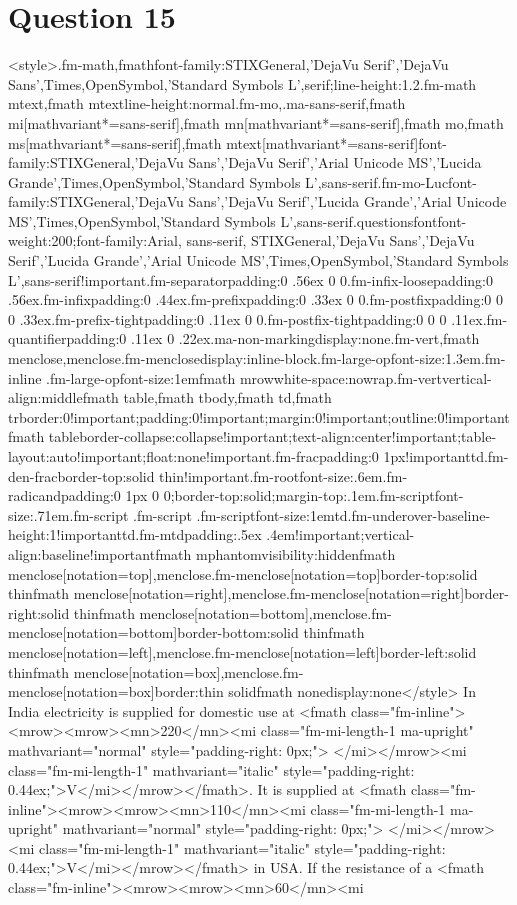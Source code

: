 \documentclass{article}
\begin{document}
\section*{Question 15}
<style>.fm-math,fmath{font-family:STIXGeneral,'DejaVu Serif','DejaVu Sans',Times,OpenSymbol,'Standard Symbols L',serif;line-height:1.2}.fm-math mtext,fmath mtext{line-height:normal}.fm-mo,.ma-sans-serif,fmath mi[mathvariant*=sans-serif],fmath mn[mathvariant*=sans-serif],fmath mo,fmath ms[mathvariant*=sans-serif],fmath mtext[mathvariant*=sans-serif]{font-family:STIXGeneral,'DejaVu Sans','DejaVu Serif','Arial Unicode MS','Lucida Grande',Times,OpenSymbol,'Standard Symbols L',sans-serif}.fm-mo-Luc{font-family:STIXGeneral,'DejaVu Sans','DejaVu Serif','Lucida Grande','Arial Unicode MS',Times,OpenSymbol,'Standard Symbols L',sans-serif}.questionsfont{font-weight:200;font-family:Arial, sans-serif, STIXGeneral,'DejaVu Sans','DejaVu Serif','Lucida Grande','Arial Unicode MS',Times,OpenSymbol,'Standard Symbols L',sans-serif!important}.fm-separator{padding:0 .56ex 0 0}.fm-infix-loose{padding:0 .56ex}.fm-infix{padding:0 .44ex}.fm-prefix{padding:0 .33ex 0 0}.fm-postfix{padding:0 0 0 .33ex}.fm-prefix-tight{padding:0 .11ex 0 0}.fm-postfix-tight{padding:0 0 0 .11ex}.fm-quantifier{padding:0 .11ex 0 .22ex}.ma-non-marking{display:none}.fm-vert,fmath menclose,menclose.fm-menclose{display:inline-block}.fm-large-op{font-size:1.3em}.fm-inline .fm-large-op{font-size:1em}fmath mrow{white-space:nowrap}.fm-vert{vertical-align:middle}fmath table,fmath tbody,fmath td,fmath tr{border:0!important;padding:0!important;margin:0!important;outline:0!important}fmath table{border-collapse:collapse!important;text-align:center!important;table-layout:auto!important;float:none!important}.fm-frac{padding:0 1px!important}td.fm-den-frac{border-top:solid thin!important}.fm-root{font-size:.6em}.fm-radicand{padding:0 1px 0 0;border-top:solid;margin-top:.1em}.fm-script{font-size:.71em}.fm-script .fm-script .fm-script{font-size:1em}td.fm-underover-base{line-height:1!important}td.fm-mtd{padding:.5ex .4em!important;vertical-align:baseline!important}fmath mphantom{visibility:hidden}fmath menclose[notation=top],menclose.fm-menclose[notation=top]{border-top:solid thin}fmath menclose[notation=right],menclose.fm-menclose[notation=right]{border-right:solid thin}fmath menclose[notation=bottom],menclose.fm-menclose[notation=bottom]{border-bottom:solid thin}fmath menclose[notation=left],menclose.fm-menclose[notation=left]{border-left:solid thin}fmath menclose[notation=box],menclose.fm-menclose[notation=box]{border:thin solid}fmath none{display:none}</style> In India electricity is supplied for domestic use at <fmath class="fm-inline"><mrow><mrow><mn>220</mn><mi class="fm-mi-length-1 ma-upright" mathvariant="normal" style="padding-right: 0px;"> </mi></mrow><mi class="fm-mi-length-1" mathvariant="italic" style="padding-right: 0.44ex;">V</mi></mrow></fmath>. It is supplied at <fmath class="fm-inline"><mrow><mrow><mn>110</mn><mi class="fm-mi-length-1 ma-upright" mathvariant="normal" style="padding-right: 0px;"> </mi></mrow><mi class="fm-mi-length-1" mathvariant="italic" style="padding-right: 0.44ex;">V</mi></mrow></fmath> in USA. If the resistance of a <fmath class="fm-inline"><mrow><mrow><mn>60</mn><mi 
\end{document}
